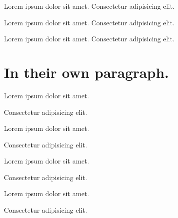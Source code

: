 \documentclass[12pt]{article}
\begin{document}
Lorem ipsum dolor sit amet.  Consectetur adipisicing elit.  

Lorem ipsum dolor sit amet.  Consectetur adipisicing elit.  

Lorem ipsum dolor sit amet.  Consectetur adipisicing elit.   

\section*{In their own paragraph.}

Lorem ipsum dolor sit amet.

Consectetur adipisicing elit.

Lorem ipsum dolor sit amet.


Consectetur adipisicing elit.

Lorem ipsum dolor sit amet.


Consectetur adipisicing elit.

Lorem ipsum dolor sit amet.

 

Consectetur adipisicing elit.
\end{document}
